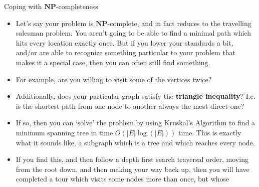 \documentclass{beamer}
\begin{document}
\begin{frame}{Coping with $\mathbf{NP}$-completeness}
    \begin{itemize}{Coping with $\mathbf{NP}$-completeness}
        \item Let's say your problem is $\mathbf{NP}$-complete, and in fact reduces to the travelling salesman problem. You aren't going to be able to find a minimal path which hits every location exactly once. But if you lower your standards a bit, and/or are able to recognize something particular to your problem that makes it a special case, then you can often still find something. 
        \item For example, are you willing to visit some of the vertices twice?
        \item Additionally, does your particular graph satisfy the \textbf{triangle inequality}? I.e. is the shortest path from one node to another always the most direct one? 
        \item If so, then you can `solve' the problem by using Kruskal's Algorithm to find a minimum spanning tree in time $O(|E|\log(|E|))$ time. This is exactly what it sounds like, a subgraph which is a tree and which reaches every node. 
        \item If you find this, and then follow a depth first search traversal order, moving from the root down, and then making your way back up, then you will have completed a tour which visits some nodes more than once, but whose
    \end{itemize}

\end{frame}
\end{document}
